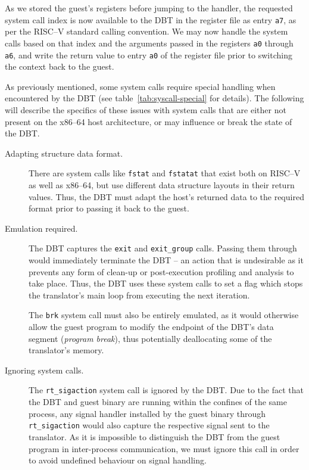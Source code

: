 As we stored the guest's registers before jumping to the handler, the requested system call index is now available to the DBT in the register file as entry \texttt{a7}, as per the RISC--V standard calling convention.
We may now handle the system calls based on that index and the arguments passed in the registers \texttt{a0} through \texttt{a6}, and write the return value to entry \texttt{a0} of the register file prior to switching the context back to the guest.

As previously mentioned, some system calls require special handling when encountered by the DBT (see table~\vref{tab:syscall-special} for details).
The following will describe the specifics of these issues with system calls that are either not present on the x86--64 host architecture, or may influence or break the state of the DBT\@.
\begin{description}
	\item[Adapting structure data format.]
	There are system calls like \texttt{fstat} and \texttt{fstatat} that exist both on RISC--V as well as x86--64, but use different data structure layouts in their return values.
	Thus, the DBT must adapt the host's returned data to the required format prior to passing it back to the guest.
	
	
	\item[Emulation required.]
	The DBT captures the \texttt{exit} and \texttt{exit\_group} calls.
	Passing them through would immediately terminate the DBT -- an action that is undesirable as it prevents any form of clean-up or post-execution profiling and analysis to take place.
	Thus, the DBT uses these system calls to set a flag which stops the translator's main loop from executing the next iteration.
	
	The \texttt{brk} system call must also be entirely emulated, as it would otherwise allow the guest program to modify the endpoint of the DBT's data segment (\textit{program break}), thus potentially deallocating some of the translator's memory.
	
	
	\item[Ignoring system calls.]
	The \texttt{rt\_sigaction} system call is ignored by the DBT\@.
	Due to the fact that the DBT and guest binary are running within the confines of the same process, any signal handler installed by the guest binary through \texttt{rt\_sigaction} would also capture the respective signal sent to the translator.
	As it is impossible to distinguish the DBT from the guest program in inter-process communication, we must ignore this call in order to avoid undefined behaviour on signal handling.
	

\end{description}
